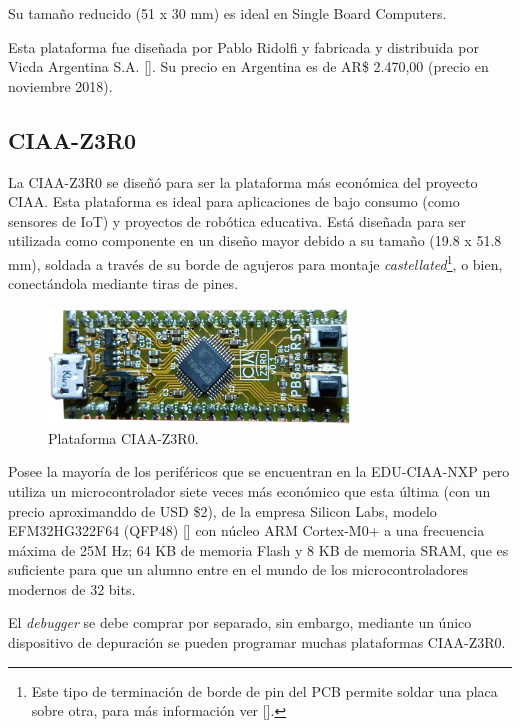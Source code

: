 Su tamaño reducido (51 x 30 mm) es ideal en Single Board Computers.

Esta plataforma fue diseñada por Pablo Ridolfi y fabricada y distribuida por Vicda Argentina S.A. []. Su precio en Argentina es de AR\$ 2.470,00 (precio en noviembre 2018).

\subsection{CIAA-Z3R0}
\label{sec:CIAA-Z3R0}

La CIAA-Z3R0 se diseñó para ser la plataforma más económica del proyecto CIAA. Esta plataforma es ideal para aplicaciones de bajo consumo (como sensores de IoT) y proyectos de robótica educativa. Está diseñada para ser utilizada como componente en un diseño mayor debido a su tamaño (19.8 x 51.8 mm), soldada a través de su borde de agujeros para montaje \emph{castellated}\footnote{Este tipo de terminación de borde de pin del PCB permite soldar una placa sobre otra, para más información ver [].}, o bien, conectándola mediante tiras de pines.

\begin{figure}[!htbp]
\begin{center}  %
\includegraphics*[width=8cm]{Figures/CIAA-Z3R0_Foto.png}
\par\caption{Plataforma CIAA-Z3R0.}\label{fig:ciaaZero}
\end{center}
\end{figure}

Posee la mayoría de los periféricos que se encuentran en la EDU-CIAA-NXP pero utiliza un microcontrolador siete veces más económico que esta última (con un precio aproximanddo de USD \$2), de la empresa Silicon Labs, modelo EFM32HG322F64 (QFP48) [] con núcleo ARM Cortex-M0+ a una frecuencia máxima de 25M Hz; 64 KB de memoria Flash y 8 KB de memoria SRAM, que es suficiente para que un alumno entre en el mundo de los microcontroladores modernos de 32 bits.

El \emph{debugger} se debe comprar por separado, sin embargo, mediante un único dispositivo de depuración se pueden programar muchas plataformas CIAA-Z3R0.

